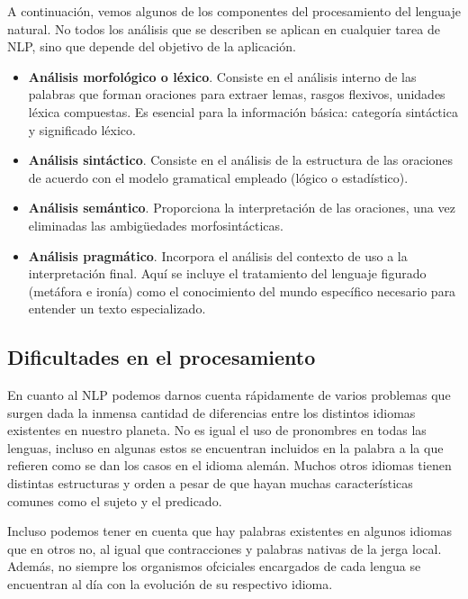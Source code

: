 \documentclass[runningheads]{llncs}
\begin{document}
A continuación, vemos algunos de los componentes del procesamiento del lenguaje natural. No todos los análisis que se describen se aplican en cualquier tarea de NLP, sino que depende del objetivo de la aplicación.

\begin{itemize}
    \item \textbf{Análisis morfológico o léxico}. Consiste en el análisis interno de las palabras que forman oraciones para extraer lemas, rasgos flexivos, unidades léxica compuestas. Es esencial para la información básica: categoría sintáctica y significado léxico.
    \item \textbf{Análisis sintáctico}. Consiste en el análisis de la estructura de las oraciones de acuerdo con el modelo gramatical empleado (lógico o estadístico).
    \item \textbf{Análisis semántico}. Proporciona la interpretación de las oraciones, una vez eliminadas las ambigüedades morfosintácticas.
    \item \textbf{Análisis pragmático}. Incorpora el análisis del contexto de uso a la interpretación final. Aquí se incluye el tratamiento del lenguaje figurado (metáfora e ironía) como el conocimiento del mundo específico necesario para entender un texto especializado.
\end{itemize}


 
\subsection{Dificultades en el procesamiento}
 
En cuanto al NLP podemos darnos cuenta rápidamente de varios problemas que surgen dada la inmensa cantidad de diferencias entre los distintos idiomas existentes en nuestro planeta. No es igual el uso de pronombres en todas las lenguas, incluso en algunas estos se encuentran incluidos en la palabra a la que refieren como se dan los casos en el idioma alemán. Muchos otros idiomas tienen distintas estructuras y orden a pesar de que hayan muchas características comunes como el sujeto y el predicado.

Incluso podemos tener en cuenta que hay palabras existentes en algunos idiomas que en otros no, al igual que contracciones y palabras nativas de la jerga local. Además, no siempre los organismos ofciciales encargados de cada lengua se encuentran al día con la evolución de su respectivo idioma.
\end{document}

